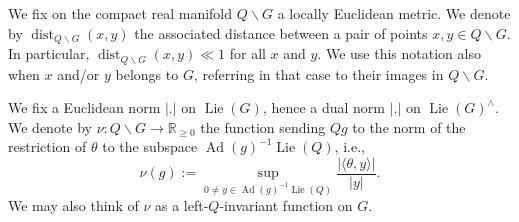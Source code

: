 \documentclass[reqno]{amsart}
\DeclareMathOperator{\Ad}{Ad}
\DeclareMathOperator{\dist}{dist}
\DeclareMathOperator{\Lie}{Lie}
\theoremstyle{plain} \newtheorem{theorem} {Theorem}
\theoremstyle{definition} \newtheorem{definition} [theorem] {Definition}
\theoremstyle{itplain} %
\numberwithin{equation}{section}
\numberwithin{theorem}{section}
\renewcommand{\geq}{\geqslant}
\begin{document}
We fix on the compact real manifold $Q \backslash G$ a locally Euclidean metric.  We denote by $\dist_{Q \backslash G}(x,y)$ the associated distance between a pair of points $x, y \in Q \backslash G$.  In particular, $\dist_{Q \backslash G}(x,y) \ll 1$ for all $x$ and $y$.  We use this notation also when $x$ and/or $y$ belongs to $G$, referring in that case to their images in $Q \backslash G$.

We fix a Euclidean norm $|.|$ on $\Lie(G)$, hence a dual norm $|.|$ on $\Lie(G)^\wedge$.  We denote by $\nu : Q \backslash G \rightarrow \mathbb{R}_{\geq 0}$ the function sending $Q g$ to the norm of the restriction of $\theta$ to the subspace $\Ad(g)^{-1} \Lie(Q)$, i.e.,
\begin{equation*}
  \nu(g) := \sup_{0 \neq y \in \Ad(g)^{-1} \Lie(Q)}
  \frac{|\langle \theta, y \rangle|}{ |y|}.
\end{equation*}
We may also think of $\nu$ as a left-$Q$-invariant function on $G$.
\end{document}
